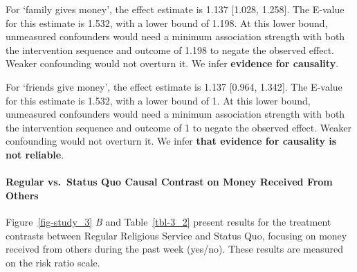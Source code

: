 \documentclass[
  single column]{article}
\let\oldparagraph\paragraph
\renewcommand{\paragraph}[1]{\oldparagraph{#1}\mbox{}}
\begin{document}
For `family gives money', the effect estimate is 1.137 {[}1.028,
1.258{]}. The E-value for this estimate is 1.532, with a lower bound of
1.198. At this lower bound, unmeasured confounders would need a minimum
association strength with both the intervention sequence and outcome of
1.198 to negate the observed effect. Weaker confounding would not
overturn it. We infer \textbf{evidence for causality}.

For `friends give money', the effect estimate is 1.137 {[}0.964,
1.342{]}. The E-value for this estimate is 1.532, with a lower bound of
1. At this lower bound, unmeasured confounders would need a minimum
association strength with both the intervention sequence and outcome of
1 to negate the observed effect. Weaker confounding would not overturn
it. We infer \textbf{that evidence for causality is not reliable}.

\paragraph{Regular vs.~Status Quo Causal Contrast on Money Received From
Others}\label{regular-vs.-status-quo-causal-contrast-on-money-received-from-others}

Figure~\ref{fig-study_3} \emph{B} and Table~\ref{tbl-3_2} present
results for the treatment contrasts between Regular Religious Service
and Status Quo, focusing on money received from others during the past
week (yes/no). These results are measured on the risk ratio scale.
\end{document}
